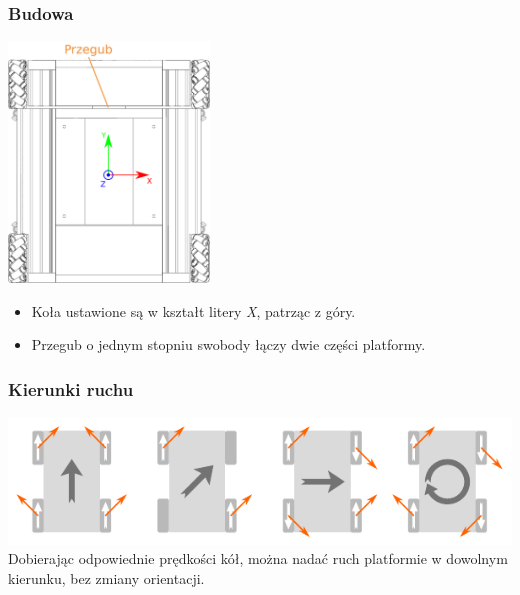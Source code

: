 \documentclass{beamer}
\begin{document}
	\begin{frame}
		\frametitle{Budowa}
		\centering
		\includegraphics[width=0.4\textwidth]{graphics/base.pdf}
		\begin{itemize}
			\item Koła ustawione są w kształt litery \emph{X}, patrząc z góry.
			\item Przegub o jednym stopniu swobody łączy dwie części platformy.
		\end{itemize}
	\end{frame}
	
	\begin{frame}
		\frametitle{Kierunki ruchu}
		\centering
		\includegraphics[width=\textwidth]{graphics/mecanum_dirs_vect.pdf} \\
		Dobierając odpowiednie prędkości kół, można nadać ruch platformie w dowolnym kierunku, bez zmiany orientacji.
	\end{frame}
	
\end{document}

